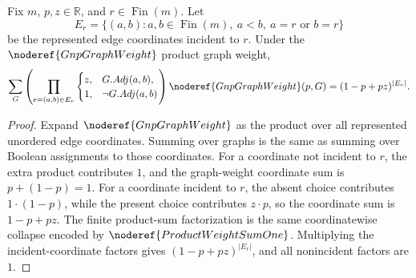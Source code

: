 \begin{helper}[GnpVertexIncidentEdgeGeneratingFunction]
Fix \(m\), \(p,z\in\mathbb R\), and \(r\in\operatorname{Fin}(m)\).  Let
\[
E_r=\{(a,b):a,b\in\operatorname{Fin}(m),\ a<b,\ a=r\text{ or }b=r\}
\]
be the represented edge coordinates incident to \(r\).  Under the
\(\noderef{GnpGraphWeight}\) product graph weight,
\[
\sum_G
\left(\prod_{e=(a,b)\in E_r}
  \begin{cases}
  z,&G.Adj(a,b),\\
  1,&\neg G.Adj(a,b)
  \end{cases}\right)
\noderef{GnpGraphWeight}(p,G)
=(1-p+pz)^{|E_r|}.
\]
\end{helper}
\begin{proof}
Expand \(\noderef{GnpGraphWeight}\) as the product over all represented
unordered edge coordinates.  Summing over graphs is the same as summing over
Boolean assignments to those coordinates.  For a coordinate not incident to
\(r\), the extra product contributes \(1\), and the graph-weight coordinate
sum is \(p+(1-p)=1\).  For a coordinate incident to \(r\), the absent choice
contributes \(1\cdot(1-p)\), while the present choice contributes \(z\cdot p\),
so the coordinate sum is \(1-p+pz\).  The finite product-sum factorization is
the same coordinatewise collapse encoded by \(\noderef{ProductWeightSumOne}\).
Multiplying the incident-coordinate factors gives \((1-p+pz)^{|E_r|}\), and
all nonincident factors are \(1\).
\end{proof}
